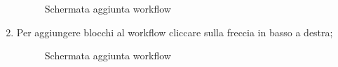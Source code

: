 \begin{enumerate}
	\begin{figure}[H]
		\centering
		\caption{Schermata aggiunta workflow}
	\end{figure}

\newpage
\item Per aggiungere blocchi al workflow cliccare sulla freccia in basso a destra;

\begin{figure}[H]
	\centering
	\caption{Schermata aggiunta workflow}
\end{figure}


\end{enumerate}
